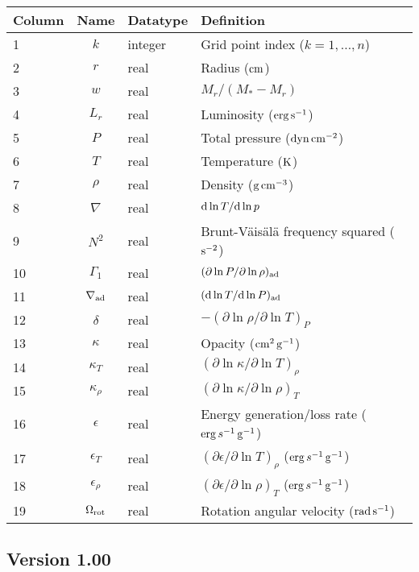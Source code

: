 \documentclass{article}
\newcommand{\diff}{\ensuremath{{\rm d}}}
\newcommand{\Mstar}{\ensuremath{M_{\ast}}}
\newcommand{\cm}{\ensuremath{{\rm cm}}}
\newcommand{\gram}{\ensuremath{{\rm g}}}
\newcommand{\second}{\ensuremath{{\rm s}}}
\newcommand{\dyne}{\ensuremath{{\rm dyn}}}
\newcommand{\erg}{\ensuremath{{\rm erg}}}
\newcommand{\kelvin}{\ensuremath{{\rm K}}}
\begin{document}
\begin{table}[h!]
\begin{tabular}{|l|c|l|l|} \hline
Column & Name & Datatype & Definition \\ \hline
1      & $k$ & integer & Grid point index ($k=1,\ldots,n$) \\
2      & $r$ & real    & Radius ($\cm$) \\
3      & $w$ & real    & $M_{r}/(\Mstar-M_{r})$ \\
4      & $L_{r}$ & real & Luminosity ($\erg\,\second^{-1}$) \\
5      & $P$ & real    & Total pressure ($\dyne\,\cm^{-2}$) \\
6      & $T$ & real    & Temperature ($\kelvin$) \\
7      & $\rho$ & real & Density ($\gram\,\cm^{-3}$) \\
8      & $\nabla$ & real & $\diff \ln T/\diff \ln p$ \\
9      & $N^{2}$ & real & Brunt-V\"ais\"al\"a frequency squared ($\second^{-2}$) \\
10     & $\Gamma_{1}$ & real & $(\partial \ln P/\partial \ln \rho)_{\rm ad}$ \\
11     & $\nabla_{\rm ad}$ & real & $(\diff \ln T/\diff \ln P)_{\rm ad}$ \\
12     & $\delta$ & real & $-(\partial \ln \rho/\partial \ln T)_{P}$  \\
13     & $\kappa$ & real & Opacity ($\cm^{2}\,\gram^{-1}$) \\
14     & $\kappa_{T}$ & real & $(\partial \ln \kappa/\partial \ln T)_{\rho}$ \\
15     & $\kappa_{\rho}$ & real & $(\partial \ln \kappa/\partial \ln \rho)_{T}$ \\
16     & $\epsilon$ & real & Energy generation/loss rate ($\erg\,s^{-1}\,\gram^{-1}$) \\
17     & $\epsilon_{T}$ & real & $(\partial \epsilon/\partial \ln T)_{\rho}$ ($\erg\,s^{-1}\,\gram^{-1}$) \\
18     & $\epsilon_{\rho}$ & real & $(\partial \epsilon/\partial \ln \rho)_{T}$ ($\erg\,s^{-1}\,\gram^{-1}$) \\
19     & $\Omega_{\rm rot}$ & real & Rotation angular velocity (${\rm rad}\,\second^{-1}$) \\  \hline
\end{tabular}
\end{table}

\subsection*{Version 1.00}
\end{document}
